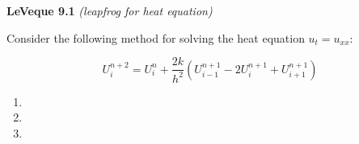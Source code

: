 \textbf{LeVeque 9.1}  \textit{(leapfrog for heat equation)}

Consider the following method for solving the heat equation $u_t = u_{xx}$:

$$
U_i^{n+2} = U_i^n + \frac{2k}{h^2}\left(U_{i-1}^{n+1} - 2U_i^{n+1} + U_{i+1}^{n+1} \right)
$$


\begin{enumerate}
  \item 
  \pagebreak
  \item 
  \pagebreak
  \item 
\end{enumerate} 